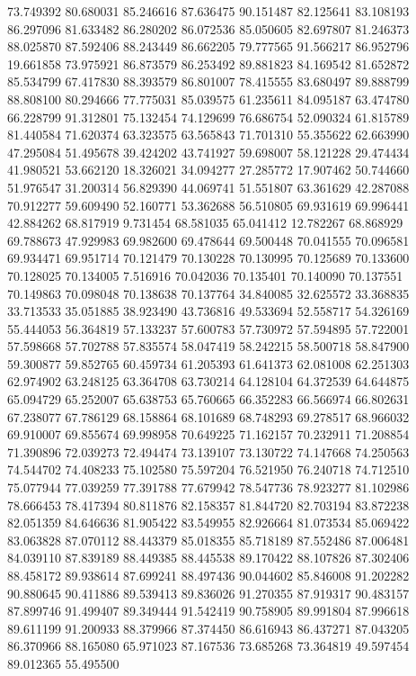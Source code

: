 73.749392
80.680031
85.246616
87.636475
90.151487
82.125641
83.108193
86.297096
81.633482
86.280202
86.072536
85.050605
82.697807
81.246373
88.025870
87.592406
88.243449
86.662205
79.777565
91.566217
86.952796
19.661858
73.975921
86.873579
86.253492
89.881823
84.169542
81.652872
85.534799
67.417830
88.393579
86.801007
78.415555
83.680497
89.888799
88.808100
80.294666
77.775031
85.039575
61.235611
84.095187
63.474780
66.228799
91.312801
75.132454
74.129699
76.686754
52.090324
61.815789
81.440584
71.620374
63.323575
63.565843
71.701310
55.355622
62.663990
47.295084
51.495678
39.424202
43.741927
59.698007
58.121228
29.474434
41.980521
53.662120
18.326021
34.094277
27.285772
17.907462
50.744660
51.976547
31.200314
56.829390
44.069741
51.551807
63.361629
42.287088
70.912277
59.609490
52.160771
53.362688
56.510805
69.931619
69.996441
42.884262
68.817919
9.731454
68.581035
65.041412
12.782267
68.868929
69.788673
47.929983
69.982600
69.478644
69.500448
70.041555
70.096581
69.934471
69.951714
70.121479
70.130228
70.130995
70.125689
70.133600
70.128025
70.134005
7.516916
70.042036
70.135401
70.140090
70.137551
70.149863
70.098048
70.138638
70.137764
34.840085
32.625572
33.368835
33.713533
35.051885
38.923490
43.736816
49.533694
52.558717
54.326169
55.444053
56.364819
57.133237
57.600783
57.730972
57.594895
57.722001
57.598668
57.702788
57.835574
58.047419
58.242215
58.500718
58.847900
59.300877
59.852765
60.459734
61.205393
61.641373
62.081008
62.251303
62.974902
63.248125
63.364708
63.730214
64.128104
64.372539
64.644875
65.094729
65.252007
65.638753
65.760665
66.352283
66.566974
66.802631
67.238077
67.786129
68.158864
68.101689
68.748293
69.278517
68.966032
69.910007
69.855674
69.998958
70.649225
71.162157
70.232911
71.208854
71.390896
72.039273
72.494474
73.139107
73.130722
74.147668
74.250563
74.544702
74.408233
75.102580
75.597204
76.521950
76.240718
74.712510
75.077944
77.039259
77.391788
77.679942
78.547736
78.923277
81.102986
78.666453
78.417394
80.811876
82.158357
81.844720
82.703194
83.872238
82.051359
84.646636
81.905422
83.549955
82.926664
81.073534
85.069422
83.063828
87.070112
88.443379
85.018355
85.718189
87.552486
87.006481
84.039110
87.839189
88.449385
88.445538
89.170422
88.107826
87.302406
88.458172
89.938614
87.699241
88.497436
90.044602
85.846008
91.202282
90.880645
90.411886
89.539413
89.836026
91.270355
87.919317
90.483157
87.899746
91.499407
89.349444
91.542419
90.758905
89.991804
87.996618
89.611199
91.200933
88.379966
87.374450
86.616943
86.437271
87.043205
86.370966
88.165080
65.971023
87.167536
73.685268
73.364819
49.597454
89.012365
55.495500
